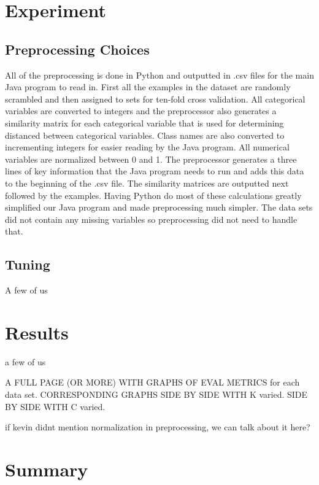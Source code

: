 \documentclass[twoside,11pt]{article}
\begin{document}
\section{Experiment}

\subsection{Preprocessing Choices}

All of the preprocessing is done in Python and outputted in .csv files for the main Java program to read in. First all the examples in the dataset are randomly scrambled and then assigned to sets for ten-fold cross validation. All categorical variables are converted to integers and the preprocessor also generates a similarity matrix for each categorical variable that is used for determining distanced between categorical variables. Class names are also converted to incrementing integers for easier reading by the Java program. All numerical variables are normalized between 0 and 1. The preprocessor generates a three lines of key information that the Java program needs to run and adds this data to the beginning of the .csv file. The similarity matrices are outputted next followed by the examples. Having Python do most of these calculations greatly simplified our Java program and made preprocessing much simpler. The data sets did not contain any missing variables so preprocessing did not need to handle that. 

\subsection{Tuning}

A few of us

\section{Results}

a few of us

A FULL PAGE (OR MORE) WITH GRAPHS OF EVAL METRICS for each data set. CORRESPONDING GRAPHS SIDE BY SIDE WITH K varied. SIDE BY SIDE WITH C varied.

if kevin didnt mention normalization in preprocessing, we can talk about it here?

\section{Summary}




\end{document}
